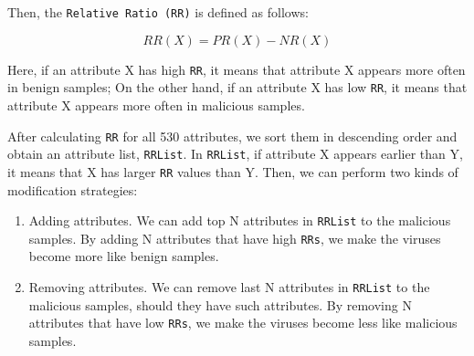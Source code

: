 \documentclass[11pt]{article}
\begin{document}
Then, the \texttt{Relative Ratio (RR)} is defined as follows:

\begin{equation}
RR(X) = PR(X) - NR(X)
\end{equation}

Here, if an attribute X has high \texttt{RR}, it means that attribute X appears more often in benign samples; On the other hand, if an attribute X has low \texttt{RR}, it means that attribute X appears more often in malicious samples.

After calculating \texttt{RR} for all 530 attributes, we sort them in descending order and obtain an attribute list, \texttt{RRList}. In \texttt{RRList}, if attribute X appears earlier than Y, it means that X has larger \texttt{RR} values than Y. Then, we can perform two kinds of modification strategies:
\begin{enumerate}
\item {Adding attributes.} 
We can add top N attributes in \texttt{RRList} to the malicious samples. By adding N attributes that have high \texttt{RRs}, we make the viruses become more like benign samples.
\item {Removing attributes.}
We can remove last N attributes in \texttt{RRList} to the malicious samples, should they have such attributes. By removing N attributes that have low \texttt{RRs}, we make the viruses become less like malicious samples.
\end{enumerate}


\end{document}
